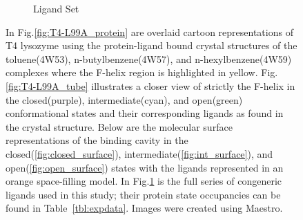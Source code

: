 \documentclass[T4paper.tex]{subfiles}
\begin{document}
\begin{figure}[!ht]
\begin{subfigure}{0.75\textwidth}
   \caption{Ligand Set}
   \label{fig:ligand_set}
\end{subfigure}\hfill
\caption{In Fig.\ref{fig:T4-L99A_protein} are overlaid cartoon representations of T4 lysozyme using the protein-ligand bound crystal structures of the toluene(4W53), n-butylbenzene(4W57), and n-hexylbenzene(4W59) complexes where the F-helix region is highlighted in yellow.
Fig.\ref{fig:T4-L99A_tube} illustrates a closer view of strictly the F-helix in the closed(purple), intermediate(cyan), and open(green) conformational states and their corresponding ligands as found in the crystal structure.
Below are the molecular surface representations of the binding cavity in the closed(\ref{fig:closed_surface}), intermediate(\ref{fig:int_surface}), and open(\ref{fig:open_surface}) states with the ligands represented in an orange space-filling model.
In Fig.\ref{fig:ligand_set} is the full series of congeneric ligands used in this study; their protein state occupancies can be found in Table~\ref{tbl:expdata}.
Images were created using Maestro\cite{Maestro}.}
\label{fig:T4-L99A}
\end{figure}
\end{document}
